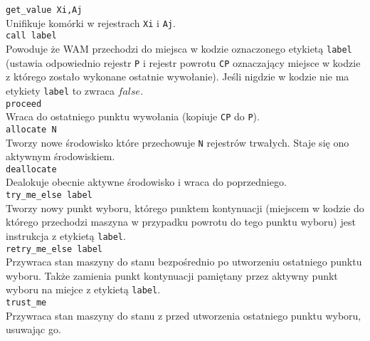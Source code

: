 \texttt{get\_value Xi,Aj}\\
Unifikuje komórki w rejestrach \texttt{Xi} i \texttt{Aj}.\\

\texttt{call label}\\
Powoduje że WAM przechodzi do miejsca w kodzie oznaczonego etykietą \texttt{label} (ustawia odpowiednio rejestr \texttt{P} i rejestr powrotu \texttt{CP} oznaczający miejsce w kodzie z którego zostało wykonane ostatnie wywołanie). Jeśli nigdzie w kodzie nie ma etykiety \texttt{label} to zwraca $false$.\\

\texttt{proceed}\\
Wraca do ostatniego punktu wywołania (kopiuje \texttt{CP} do \texttt{P}).\\

\texttt{allocate N}\\
Tworzy nowe środowisko które przechowuje \texttt{N} rejestrów trwałych. Staje się ono aktywnym środowiskiem.\\

\texttt{deallocate}\\
Dealokuje obecnie aktywne środowisko i wraca do poprzedniego.\\

\texttt{try\_me\_else label}\\
Tworzy nowy punkt wyboru, którego punktem kontynuacji (miejscem w kodzie do którego przechodzi maszyna w przypadku powrotu do tego punktu wyboru) jest instrukcja z etykietą \texttt{label}.\\

\texttt{retry\_me\_else label}\\
Przywraca stan maszyny do stanu bezpośrednio po utworzeniu ostatniego punktu wyboru. Także zamienia punkt kontynuacji pamiętany przez aktywny punkt wyboru na miejce z etykietą \texttt{label}.\\

\texttt{trust\_me}\\
Przywraca stan maszyny do stanu z przed utworzenia ostatniego punktu wyboru, usuwając go.